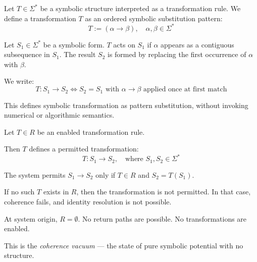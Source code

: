 \begin{definition} \label{def:transformation-rule}
Let $T \in \Sigma^*$ be a symbolic structure interpreted as a transformation rule.  
We define a transformation $T$ as an ordered symbolic substitution pattern:
\begin{equation} \label{eq:transformation}
T := (\alpha \rightarrow \beta), \quad \alpha, \beta \in \Sigma^*
\end{equation}

Let $S_1 \in \Sigma^*$ be a symbolic form. $T$ acts on $S_1$ if $\alpha$ appears as a contiguous subsequence in $S_1$.  
The result $S_2$ is formed by replacing the first occurrence of $\alpha$ with $\beta$.

We write:
\begin{equation} \label{eq:transformation-application}
T: S_1 \rightarrow S_2 \iff S_2 = S_1 \text{ with } \alpha \rightarrow \beta \text{ applied once at first match}
\end{equation}

This defines symbolic transformation as pattern substitution, without invoking numerical or algorithmic semantics.
\end{definition}

\begin{definition} \label{def:permitted-transformation}
Let $T \in R$ be an enabled transformation rule.

Then $T$ defines a permitted transformation:
\begin{equation} \label{eq:permitted-transformation}
T: S_1 \rightarrow S_2, \quad \text{where } S_1, S_2 \in \Sigma^*
\end{equation}

The system permits $S_1 \rightarrow S_2$ only if $T \in R$ and $S_2 = T(S_1)$.

If no such $T$ exists in $R$, then the transformation is not permitted.  
In that case, coherence fails, and identity resolution is not possible.
\end{definition}

\begin{definition} \label{def:initial-condition}
At system origin, $R = \emptyset$. No return paths are possible.  
No transformations are enabled.

This is the \textit{coherence vacuum} — the state of pure symbolic potential with no structure.
\end{definition}

